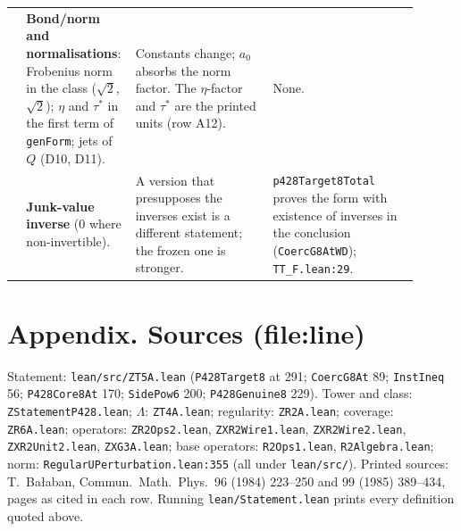 \documentclass[10pt,a4paper]{article}
\begin{document}
\begin{longtable}{@{}>{\raggedright\arraybackslash}p{0.03\linewidth}>{\raggedright\arraybackslash}p{0.19\linewidth}>{\raggedright\arraybackslash}p{0.33\linewidth}>{\raggedright\arraybackslash}p{0.35\linewidth}@{}}
8 & \textbf{Bond/norm and normalisations}: Frobenius norm in the class ($\sqrt2$, $\surd2$); $\eta$ and $\tau^*$ in the first term of \texttt{genForm}; jets of $Q$ (D10, D11). & Constants change; $a_0$ absorbs the norm factor. The $\eta$-factor and $\tau^*$ are the printed units (row A12). & None. \\
9 & \textbf{Junk-value inverse} ($0$ where non-invertible). & A version that presupposes the inverses exist is a different statement; the frozen one is stronger. & \texttt{p428Target8Total} proves the form with existence of inverses in the conclusion (\texttt{CoercG8AtWD}); \texttt{TT\_F.lean:29}. \\
\bottomrule
\end{longtable}

\section*{Appendix. Sources (file:line)}
\fontsize{8.6}{10.2}\selectfont
Statement: \texttt{lean/src/ZT5A.lean} (\texttt{P428Target8} at 291; \texttt{CoercG8At} 89; \texttt{InstIneq} 56; \texttt{P428Core8At} 170; \texttt{SidePow6} 200; \texttt{P428Genuine8} 229). Tower and class: \texttt{ZStatementP428.lean}; $\Lambda$: \texttt{ZT4A.lean}; regularity: \texttt{ZR2A.lean}; coverage: \texttt{ZR6A.lean}; operators: \texttt{ZR2Ops2.lean}, \texttt{ZXR2Wire1.lean}, \texttt{ZXR2Wire2.lean}, \texttt{ZXR2Unit2.lean}, \texttt{ZXG3A.lean}; base operators: \texttt{R2Ops1.lean}, \texttt{R2Algebra.lean}; norm: \texttt{RegularUPerturbation.lean:355} (all under \texttt{lean/src/}). Printed sources: T.~Ba{\l}aban, Commun.\ Math.\ Phys.\ 96 (1984) 223--250 and 99 (1985) 389--434, pages as cited in each row. Running \texttt{lean/Statement.lean} prints every definition quoted above.
\end{document}

